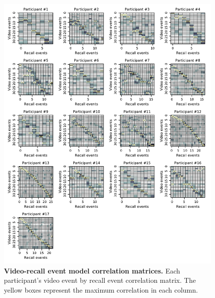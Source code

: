 \documentclass{article}
\begin{document}
\begin{figure}[tp]
\centering
\includegraphics[width=1\textwidth]{figs/supp2_matchmats.pdf}
\caption{\small \textbf{Video-recall event model correlation matrices.} Each participant's video event by recall event correlation matrix.  The yellow boxes represent the maximum correlation in each column.}
\label{fig:matchmats}
\end{figure}
\end{document}
